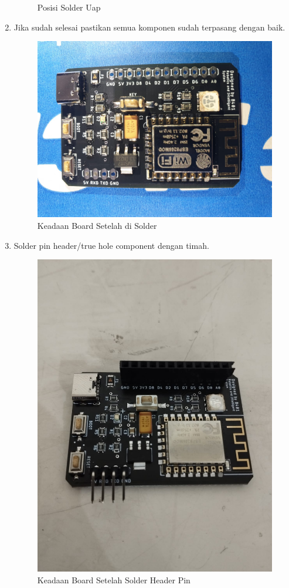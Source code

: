 \begin{enumerate}
\begin{figure}[H]
        \caption{Posisi Solder Uap}
        \label{fig:Posisi Solder Uap}
    \end{figure}
    \item Jika sudah selesai pastikan semua komponen sudah terpasang dengan baik.
    \begin{figure}[H]
        \centering
        \includegraphics[width=0.4\linewidth]{P4/img/8_keadaan_board_full_komponen.jpeg}
        \caption{Keadaan Board Setelah di Solder}
        \label{fig:KeadaanBoardSetelahSolder}
    \end{figure}
    \item Solder pin header/true hole component dengan timah.
    \begin{figure}[H]
        \centering
        \includegraphics[width=0.4\linewidth]{P4/img/9_keadaan_setelah_disolder_headernya.jpeg}
        \caption{Keadaan Board Setelah Solder Header Pin}
        \label{fig:KeadaanBoardSetelahSolderHeader}
    \end{figure}
\end{enumerate}

